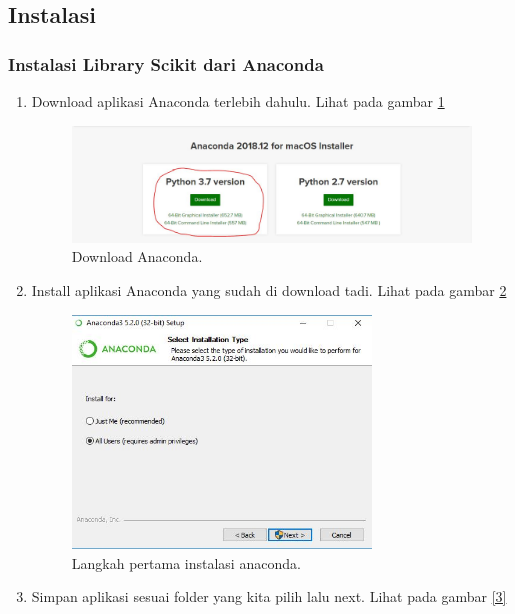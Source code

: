 \subsection{Instalasi}
\subsubsection{Instalasi Library Scikit dari Anaconda}
\begin{enumerate}
\item Download aplikasi Anaconda terlebih dahulu. Lihat pada gambar \ref{1}
\begin{figure}[!htbp]\centerline{\includegraphics[width=1\textwidth]{figures/huda/1.JPG}}\caption{Download Anaconda.}\label{1}\end{figure}
\item Install aplikasi Anaconda yang sudah di download tadi. Lihat pada gambar \ref{2}
\begin{figure}[!htbp]\centerline{\includegraphics[width=0.75\textwidth]{figures/huda/2.JPG}}\caption{Langkah pertama instalasi anaconda.}\label{2}\end{figure}
\item Simpan aplikasi sesuai folder yang kita pilih lalu next. Lihat pada gambar \ref{3}

\end{enumerate}

